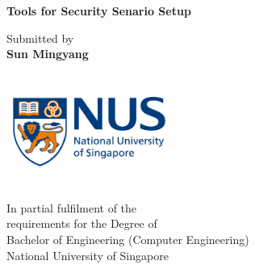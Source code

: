 \documentclass[12pt]{report}
\begin{document}
\begin{titlepage}
	\begin{center}
		\vspace*{0.5cm}

		{\large\textbf{Tools for Security Senario Setup}}
 
		\vspace{5cm}
 
 		Submitted by\\
		\textbf{Sun Mingyang}
 
		\vfill
 
		\includegraphics[width=0.4\textwidth]{./pictures/nus-logo}
 
		In partial fulfilment of the\\
		requirements for the Degree of\\
		Bachelor of Engineering (Computer Engineering)\\
		National University of Singapore\\

	\end{center}
\end{titlepage}
\end{document}
